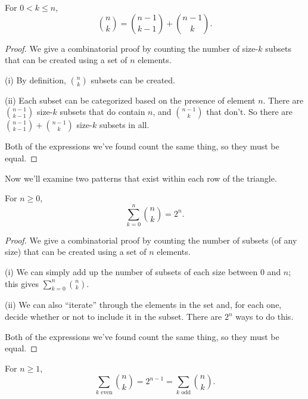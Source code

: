 \documentclass[../m055main.tex]{subfiles}
\begin{document}
\begin{theorem}
    For $0 < k \leq n$,
    \[ {n \choose k} = {n-1 \choose k-1} + {n-1 \choose k}. \]
\end{theorem}

\begin{proof}
    We give a combinatorial proof by counting the number of size-$k$ subsets that can be created using a set of $n$ elements.
    \smallskip

    (i) By definition, ${n \choose k}$ subsets can be created.
    \smallskip

    (ii) Each subset can be categorized based on the presence of element $n$.
    There are ${n-1 \choose k-1}$ size-$k$ subsets that do contain $n$, and ${n-1 \choose k}$ that don't.
    So there are ${n-1 \choose k-1} + {n-1 \choose k}$ size-$k$ subsets in all.
    \smallskip

    Both of the expressions we've found count the same thing, so they must be equal.
\end{proof}

Now we'll examine two patterns that exist within each row of the triangle.

\pagebreak

\begin{theorem} \label{rowSums}
    For $n \geq 0$,
    \[ \sum_{k=0}^{n} {n \choose k} = 2^{n}. \]
\end{theorem}

\begin{proof}
    We give a combinatorial proof by counting the number of subsets (of any size) that can be created using a set of $n$ elements.
    \smallskip

    (i) We can simply add up the number of subsets of each size between 0 and $n$; this gives $\sum\limits_{k=0}^{n} {n \choose k}$.
    \smallskip

    (ii) We can also ``iterate'' through the elements in the set and, for each one, decide whether or not to include it in the subset.
    There are $2^{n}$ ways to do this.
    \smallskip

    Both of the expressions we've found count the same thing, so they must be equal.
\end{proof}

\begin{theorem} \label{parityRowSums}
    For $n \geq 1$,
    \[ \sum_{k\text{ even}} {n \choose k} = 2^{n-1} = \sum_{k\text{ odd}} {n \choose k}. \]
\end{theorem}
\end{document}
